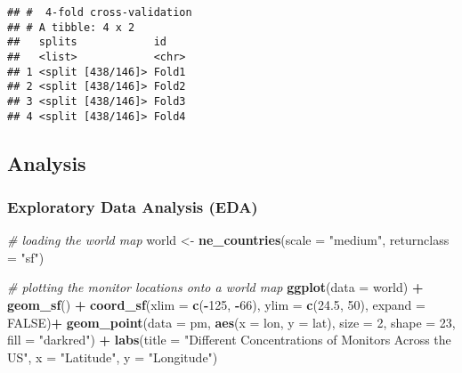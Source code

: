 \documentclass[
]{article}
\newenvironment{Shaded}{\begin{snugshade}}{\end{snugshade}}
\newcommand{\AttributeTok}[1]{\textcolor[rgb]{0.13,0.29,0.53}{#1}}
\newcommand{\CommentTok}[1]{\textcolor[rgb]{0.56,0.35,0.01}{\textit{#1}}}
\newcommand{\ConstantTok}[1]{\textcolor[rgb]{0.56,0.35,0.01}{#1}}
\newcommand{\DecValTok}[1]{\textcolor[rgb]{0.00,0.00,0.81}{#1}}
\newcommand{\FloatTok}[1]{\textcolor[rgb]{0.00,0.00,0.81}{#1}}
\newcommand{\FunctionTok}[1]{\textcolor[rgb]{0.13,0.29,0.53}{\textbf{#1}}}
\newcommand{\NormalTok}[1]{#1}
\newcommand{\OtherTok}[1]{\textcolor[rgb]{0.56,0.35,0.01}{#1}}
\newcommand{\SpecialCharTok}[1]{\textcolor[rgb]{0.81,0.36,0.00}{\textbf{#1}}}
\newcommand{\StringTok}[1]{\textcolor[rgb]{0.31,0.60,0.02}{#1}}
\begin{document}
\begin{verbatim}
## #  4-fold cross-validation 
## # A tibble: 4 x 2
##   splits            id   
##   <list>            <chr>
## 1 <split [438/146]> Fold1
## 2 <split [438/146]> Fold2
## 3 <split [438/146]> Fold3
## 4 <split [438/146]> Fold4
\end{verbatim}

\subsection{Analysis}\label{analysis}

\subsubsection{Exploratory Data Analysis
(EDA)}\label{exploratory-data-analysis-eda}

\begin{Shaded}
\begin{Highlighting}[]
\CommentTok{\# loading the world map}
\NormalTok{world }\OtherTok{\textless{}{-}} \FunctionTok{ne\_countries}\NormalTok{(}\AttributeTok{scale =} \StringTok{"medium"}\NormalTok{, }\AttributeTok{returnclass =} \StringTok{"sf"}\NormalTok{)}

\CommentTok{\# plotting the monitor locations onto a world map}
\FunctionTok{ggplot}\NormalTok{(}\AttributeTok{data =}\NormalTok{ world) }\SpecialCharTok{+}
    \FunctionTok{geom\_sf}\NormalTok{() }\SpecialCharTok{+}
    \FunctionTok{coord\_sf}\NormalTok{(}\AttributeTok{xlim =} \FunctionTok{c}\NormalTok{(}\SpecialCharTok{{-}}\DecValTok{125}\NormalTok{, }\SpecialCharTok{{-}}\DecValTok{66}\NormalTok{), }\AttributeTok{ylim =} \FunctionTok{c}\NormalTok{(}\FloatTok{24.5}\NormalTok{, }\DecValTok{50}\NormalTok{), }
             \AttributeTok{expand =} \ConstantTok{FALSE}\NormalTok{)}\SpecialCharTok{+}
    \FunctionTok{geom\_point}\NormalTok{(}\AttributeTok{data =}\NormalTok{ pm, }\FunctionTok{aes}\NormalTok{(}\AttributeTok{x =}\NormalTok{ lon, }\AttributeTok{y =}\NormalTok{ lat), }\AttributeTok{size =} \DecValTok{2}\NormalTok{, }
               \AttributeTok{shape =} \DecValTok{23}\NormalTok{, }\AttributeTok{fill =} \StringTok{"darkred"}\NormalTok{) }\SpecialCharTok{+} 
    \FunctionTok{labs}\NormalTok{(}\AttributeTok{title =} \StringTok{"Different Concentrations of Monitors Across the US"}\NormalTok{, }\AttributeTok{x =} \StringTok{"Latitude"}\NormalTok{, }\AttributeTok{y =} \StringTok{"Longitude"}\NormalTok{)}
\end{Highlighting}
\end{Shaded}
\end{document}
